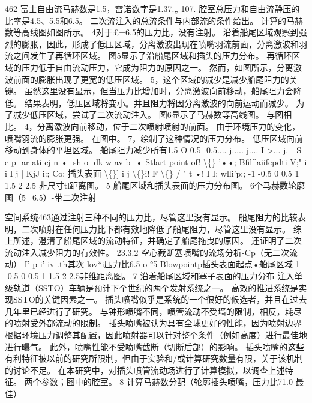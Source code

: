 \documentclass[UTF8,11pt,a4paper,openany,fontset=fandol]{ctexbook}
\begin{document}
462 富士自由流马赫数是1.5，雷诺数字是1.37.„ 107. 腔室总压力和自由流静压的比率是4.5、5.5和6.5。 二次流注入的总流条件与内部流的条件给出。 计算的马赫数等高线图如图所示。 4对于£=6.5的压力比，没有注射。 沿着船尾区域观察到强烈的膨胀，因此，形成了低压区域，分离激波出现在喷嘴羽流前面，分离激波和羽流之间发生了再循环区域。 图5显示了沿船尾区域和插头的压力分布。 再循环区域的压力低于自由流动压力，它成为阻力的原因之一。 然而，如图所示，分离激波前面的膨胀出现了更宽的低压区域。 5，这个区域的减少是减少船尾阻力的关键。 虽然这里没有显示，但当压力比增加时，分离激波向前移动，船尾阻力会降低。 结果表明，低压区域将变小。并且阻力将因分离激波的向前运动而减少。 为了减少低压区域，尝试了二次流动注入。 图6显示了马赫数等高线图。 与图相比。 4，分离激波向前移动，位于二次喷射喷射的前面。 由于环境压力的变化，喷嘴羽流的膨胀更强。 在图中。 7，绘制了这种情况的压力分布。 低压区域向前移动到身体的平坦区域。 船尾阻力减少所有1.5 O 0.5 -0.5.... j..... j.... I >... j. - S e p -ar ati-cj-n • -sh o -dk w av b- • Stlart point of! \textbackslash\{\} '••; Bfil\textasciicircum{}aiifepdti V;" i i I j | KjJ i:; Co; 插头表面 \textbackslash\{\}] i j \textbackslash\{\}i! F \textbackslash\{\} / " t •! I I: wlli'p;; -1 -0.5 0 0.5 1 1.5 2 2.5 非尺寸tl距离图。 5 船尾区域和插头表面的压力分布图。 6个马赫数轮廓图（5=6.5）-带二次注射

空间系统463通过注射三种不同的压力比，尽管这里没有显示。 船尾阻力的比较表明，二次喷射在任何压力比下都有效地降低了船尾阻力，尽管这里没有显示。 综上所述，澄清了船尾区域的流动特征，并确定了船尾拖曳的原因。 还证明了二次流动注入减少阻力的有效性。 23.3.2 空心截断塞喷嘴的流场分析-Cp（无二次流动）-I'-p i'-iv-.th其次-lov*i压力比6.5 o °5 Blowpointp插头表面起点•船尾区域-1 -0.5 0 0.5 1 1.5 2 2.5非维距离图。 7 沿着船尾区域和塞子表面的压力分布-注入单级轨道（SSTO）车辆是预计下个世纪的两个发射系统之一。 高效的推进系统是实现SSTO的关键因素之一。 插头喷嘴似乎是系统的一个很好的候选者，并且在过去几年里已经进行了研究。 与钟形喷嘴不同，喷管流动不受墙的限制，相反，耗尽的喷射受外部流动的限制。 插头喷嘴被认为具有全球更好的性能，因为喷射边界根据环境压力调整其配置，因此喷射器可以针对整个条件（例如高度）进行最佳地进行曝气。 此外，喷嘴性能不受喷嘴截断（切断后部）的影响。 插头喷嘴的这些有利特征被以前的研究所限制，但由于实验和/或计算研究数量有限，关于该机制的讨论不足。 在本研究中，对插头喷管流动场进行了计算模拟，以调查上述特征。 两个参数；图中的腔室。 8 计算马赫数分配（轮廓插头喷嘴，压力比71.0-最佳）
\end{document}
